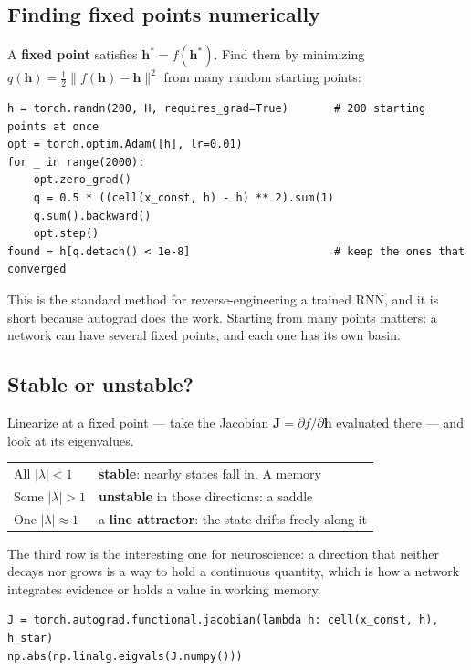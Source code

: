 \documentclass[11pt]{article}
\begin{document}
\subsection{Finding fixed points numerically}

A \textbf{fixed point} satisfies $\boldsymbol{h}^* = f(\boldsymbol{h}^*)$. Find
them by minimizing $q(\boldsymbol{h}) = \tfrac12\|f(\boldsymbol{h}) -
\boldsymbol{h}\|^2$ from many random starting points:

\begin{lstlisting}
h = torch.randn(200, H, requires_grad=True)       # 200 starting points at once
opt = torch.optim.Adam([h], lr=0.01)
for _ in range(2000):
    opt.zero_grad()
    q = 0.5 * ((cell(x_const, h) - h) ** 2).sum(1)
    q.sum().backward()
    opt.step()
found = h[q.detach() < 1e-8]                      # keep the ones that converged
\end{lstlisting}

This is the standard method for reverse-engineering a trained RNN, and it is
short because autograd does the work. Starting from many points matters: a
network can have several fixed points, and each one has its own basin.

\subsection{Stable or unstable?}

Linearize at a fixed point --- take the Jacobian $\boldsymbol{J} = \partial
f/\partial\boldsymbol{h}$ evaluated there --- and look at its eigenvalues.

\begin{center}
\begin{tabular}{@{}ll@{}}
\toprule
All $|\lambda| < 1$ & \textbf{stable}: nearby states fall in. A memory \\
Some $|\lambda| > 1$ & \textbf{unstable} in those directions: a saddle \\
One $|\lambda| \approx 1$ & a \textbf{line attractor}: the state drifts freely along it \\
\bottomrule
\end{tabular}
\end{center}

The third row is the interesting one for neuroscience: a direction that neither
decays nor grows is a way to hold a continuous quantity, which is how a network
integrates evidence or holds a value in working memory.

\begin{lstlisting}
J = torch.autograd.functional.jacobian(lambda h: cell(x_const, h), h_star)
np.abs(np.linalg.eigvals(J.numpy()))
\end{lstlisting}
\end{document}
